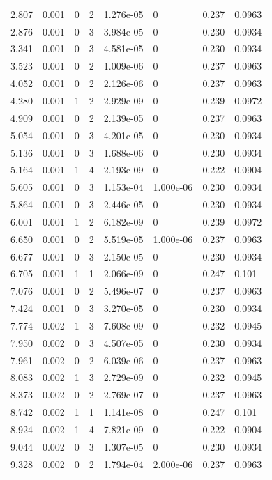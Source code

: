 \documentclass[preview]{standalone}
\begin{document}
{{\begin{tabular}{L{1.2cm}C{1.2cm} C{0.3cm}C{0.5cm} C{1.4cm}C{1.4cm} C{1.4cm}C{1.4cm}}
  2.807  &  0.001  & 0     &  2 &  1.276e-05  & 0  & 0.237 &  0.0963   \\ 
  2.876  &  0.001  & 0     &  3 &  3.984e-05  & 0  & 0.230 &  0.0934   \\ 
  3.341  &  0.001  & 0     &  3 &  4.581e-05  & 0  & 0.230 &  0.0934   \\ 
  3.523  &  0.001  & 0     &  2 &  1.009e-06  & 0  & 0.237 &  0.0963   \\ 
  4.052  &  0.001  & 0     &  2 &  2.126e-06  & 0  & 0.237 &  0.0963   \\ 
  4.280  &  0.001  & 1     &  2 &  2.929e-09  & 0  & 0.239 &  0.0972   \\ 
  4.909  &  0.001  & 0     &  2 &  2.139e-05  & 0  & 0.237 &  0.0963   \\ 
  5.054  &  0.001  & 0     &  3 &  4.201e-05  & 0  & 0.230 &  0.0934   \\ 
  5.136  &  0.001  & 0     &  3 &  1.688e-06  & 0  & 0.230 &  0.0934   \\ 
  5.164  &  0.001  & 1     &  4 &  2.193e-09  & 0  & 0.222 &  0.0904   \\ 
  5.605  &  0.001  & 0     &  3 &  1.153e-04  & 1.000e-06  & 0.230 &  0.0934   \\ 
  5.864  &  0.001  & 0     &  3 &  2.446e-05  & 0  & 0.230 &  0.0934   \\ 
  6.001  &  0.001  & 1     &  2 &  6.182e-09  & 0  & 0.239 &  0.0972   \\ 
  6.650  &  0.001  & 0     &  2 &  5.519e-05  & 1.000e-06  & 0.237 &  0.0963   \\ 
  6.677  &  0.001  & 0     &  3 &  2.150e-05  & 0  & 0.230 &  0.0934   \\ 
  6.705  &  0.001  & 1     &  1 &  2.066e-09  & 0  & 0.247 &  0.101   \\ 
  7.076  &  0.001  & 0     &  2 &  5.496e-07  & 0  & 0.237 &  0.0963   \\ 
  7.424  &  0.001  & 0     &  3 &  3.270e-05  & 0  & 0.230 &  0.0934   \\ 
  7.774  &  0.002  & 1     &  3 &  7.608e-09  & 0  & 0.232 &  0.0945   \\ 
  7.950  &  0.002  & 0     &  3 &  4.507e-05  & 0  & 0.230 &  0.0934   \\ 
  7.961  &  0.002  & 0     &  2 &  6.039e-06  & 0  & 0.237 &  0.0963   \\ 
  8.083  &  0.002  & 1     &  3 &  2.729e-09  & 0  & 0.232 &  0.0945   \\ 
  8.373  &  0.002  & 0     &  2 &  2.769e-07  & 0  & 0.237 &  0.0963   \\ 
  8.742  &  0.002  & 1     &  1 &  1.141e-08  & 0  & 0.247 &  0.101   \\ 
  8.924  &  0.002  & 1     &  4 &  7.821e-09  & 0  & 0.222 &  0.0904   \\ 
  9.044  &  0.002  & 0     &  3 &  1.307e-05  & 0  & 0.230 &  0.0934   \\ 
  9.328  &  0.002  & 0     &  2 &  1.794e-04  & 2.000e-06  & 0.237 &  0.0963   \\ 
\hline 
\end{tabular} 

}}
\end{document}
